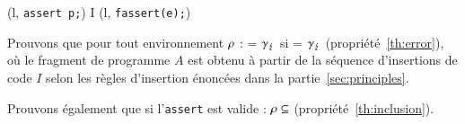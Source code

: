 \begin{center}
{
  {(l, \mbox{\lstinline'assert p;'})
     I \concat (l, \mbox{\lstinline'fassert(e);'})}
}
\end{center}

Prouvons que pour tout environnement $\rho${} :
 = $\gamma_\lightning$
si  = $\gamma_\lightning$
(propriété~\ref{th:error}),
où le fragment de programme $A$ est obtenu à partir de la séquence d'insertions
de code $I$ selon les règles d'insertion énoncées dans la
partie~\ref{sec:principles}.

Prouvons également que si l'\lstinline'assert' est valide :
$\rho \subseteq$ 
(propriété~\ref{th:inclusion}).


